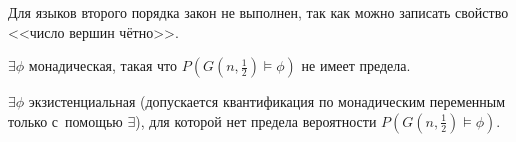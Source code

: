 \documentclass{article}
\begin{document}
Для языков второго порядка закон не выполнен, так как можно записать свойство <<число вершин
чётно>>.

\begin{theorem}
	$\exists \phi$ монадическая, такая что $P(G(n, \frac{1}{2}) \models \phi)$ не имеет предела.
\end{theorem}

\begin{theorem}[Ле Барс, 2001]
	$\exists \phi$ экзистенциальная (допускается квантификация по монадическим переменным только
	с~помощью $\exists$), для которой нет предела вероятности $P(G(n, \frac{1}{2}) \models \phi)$.
\end{theorem}
\end{document}
